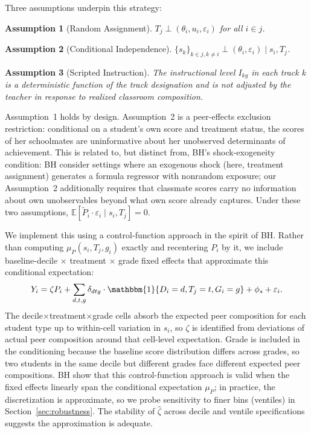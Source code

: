 \documentclass[11pt]{article}
\newtheorem{assumption}{Assumption}
\newcommand{\ind}{\mathbbm{1}}
\newcommand{\E}{\mathbb{E}}
\begin{document}
Three assumptions underpin this strategy:

\begin{assumption}[Random Assignment]
$T_j \perp (\theta_i, u_i, \varepsilon_i)$ for all $i \in j$.
\end{assumption}

\begin{assumption}[Conditional Independence]
$\{s_k\}_{k \in j, k \neq i} \perp (\theta_i, \varepsilon_i) \mid s_i, T_j$.
\end{assumption}

\begin{assumption}[Scripted Instruction]
The instructional level $I_{kg}$ in each track $k$ is a deterministic function of the track designation and is not adjusted by the teacher in response to realized classroom composition.
\end{assumption}

\noindent Assumption~1 holds by design. Assumption~2 is a peer-effects exclusion restriction: conditional on a student's own score and treatment status, the scores of her schoolmates are uninformative about her unobserved determinants of achievement. This is related to, but distinct from, BH's shock-exogeneity condition: BH consider settings where an exogenous shock (here, treatment assignment) generates a formula regressor with nonrandom exposure; our Assumption~2 additionally requires that classmate scores carry no information about own unobservables beyond what own score already captures. Under these two assumptions, $\E[\tilde{P}_i \cdot \varepsilon_i \mid s_i, T_j] = 0$.

We implement this using a control-function approach in the spirit of BH. Rather than computing $\mu_P(s_i, T_j, g_i)$ exactly and recentering $P_i$ by it, we include baseline-decile $\times$ treatment $\times$ grade fixed effects that approximate this conditional expectation:
\begin{equation}
\label{eq:bh}
Y_i = \zeta P_i + \sum_{d,t,g} \delta_{dtg} \cdot \ind\{D_i = d, T_j = t, G_i = g\} + \phi_s + \varepsilon_i.
\end{equation}
The decile$\times$treatment$\times$grade cells absorb the expected peer composition for each student type up to within-cell variation in $s_i$, so $\zeta$ is identified from deviations of actual peer composition around that cell-level expectation. Grade is included in the conditioning because the baseline score distribution differs across grades, so two students in the same decile but different grades face different expected peer compositions. BH show that this control-function approach is valid when the fixed effects linearly span the conditional expectation $\mu_P$; in practice, the discretization is approximate, so we probe sensitivity to finer bins (ventiles) in Section~\ref{sec:robustness}. The stability of $\hat{\zeta}$ across decile and ventile specifications suggests the approximation is adequate.
\end{document}

